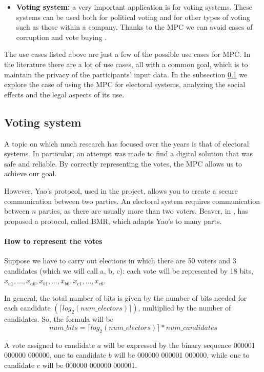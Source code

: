 \documentclass[12pt]{article}
\begin{document}
\begin{itemize}
\item \textbf{Voting system:} a very important application is for voting systems. These systems can be used both for political voting and for other types of voting such as those within a company. Thanks to the MPC we can avoid cases of corruption and vote buying \cite{voti}.

\end{itemize}

The use cases listed above are just a few of the possible use cases for MPC. In the literature there are a lot of use cases, all with a common goal, which is to maintain the privacy of the participants' input data.
In the subsection \ref{voting} we explore the case of using the MPC for electoral systems, analyzing the social effects and the legal aspects of its use.

\subsection{Voting system}\label{voting}

A topic on which much research has focused over the years is that of electoral systems. In particular, an attempt was made to find a digital solution that was safe and reliable. By correctly representing the votes, the MPC allows us to achieve our goal.

However, Yao's protocol, used in the project, allows you to create a secure communication between two parties.
An electoral system requires communication between $n$ parties, as there are usually more than two voters. Beaver, in \cite{bmr}, has proposed a protocol, called BMR, which adapts Yao's to many parts.

\paragraph{How to represent the votes}Suppose we have to carry out elections in which there are 50 voters and 3 candidates (which we will call a, b, c): each vote will be represented by 18 bits, \(x_{a1}, ..., x_{a6}, x_{b1}, ..., x_{b6}, x_{c1}, ..., x_{c6} \).

In general, the total number of bits is given by the number of bits needed for each candidate \(( \lceil log_2 (num\_electors)\rceil)\), multiplied by the number of candidates. So, the formula will be \[ num\_bits = \lceil log_2 (num\_electors)\rceil * num\_candidates \]

\noindent A vote assigned to candidate $a$ will be expressed by the binary sequence 000001 000000 000000, one to candidate $b$ will be 000000 000001 000000, while one to candidate $c$ will be 000000 000000 000001.
\end{document}
